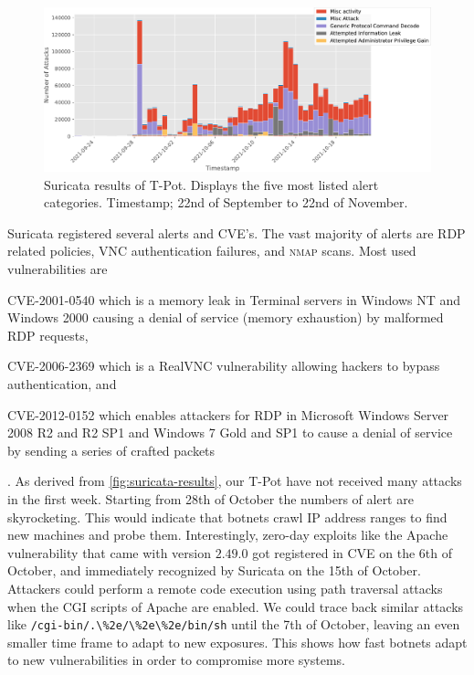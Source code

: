 \begin{figure}[ht]
    \centering
    \includegraphics[width=\textwidth]{figures/tpot-suricata-alerts.pdf}
    \caption[Suricata results of T-Pot]{Suricata results of T-Pot. Displays the five most listed alert categories. Timestamp; 22nd of September to 22nd of November.}
    \label{fig:suricata-results}
\end{figure}

Suricata registered several alerts and CVE's.
The vast majority of alerts are RDP related policies, VNC authentication failures, and \textsc{nmap} scans.
Most used vulnerabilities are 
\begin{enumerate*}[label=(\roman*)]
    \item CVE-2001-0540\cite{CVE-2001-0540} which is a memory leak in Terminal servers in Windows NT and Windows 2000 causing a denial of service (memory exhaustion) by malformed RDP requests,
    \item CVE-2006-2369\cite{CVE-2006-2369} which is a RealVNC vulnerability allowing hackers to bypass authentication, and
    \item CVE-2012-0152\cite{CVE-2012-0152} which enables attackers for RDP in Microsoft Windows Server 2008 R2 and R2 SP1 and Windows 7 Gold and SP1 to cause a denial of service by sending a series of crafted packets
\end{enumerate*}.
As derived from \autoref{fig:suricata-results}, our T-Pot have not received many attacks in the first week.
Starting from 28th of October the numbers of alert are skyrocketing.
This would indicate that botnets crawl IP address ranges to find new machines and probe them.
Interestingly, zero-day exploits like the Apache vulnerability \cite{CVE-2021-42013} that came with version $2.49.0$ got registered in CVE on the 6th of October, and immediately recognized by Suricata on the 15th of October.
Attackers could perform a remote code execution using path traversal attacks when the CGI scripts of Apache are enabled.
We could trace back similar attacks like \verb|/cgi-bin/.\%2e/\%2e\%2e/bin/sh| until the 7th of October, leaving an even smaller time frame to adapt to new exposures.
This shows how fast botnets adapt to new vulnerabilities in order to compromise more systems.

